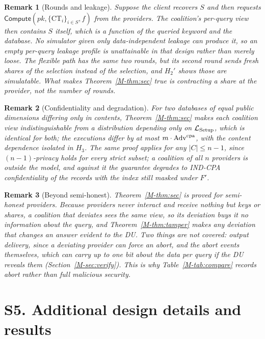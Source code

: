 \documentclass[11pt,a4paper]{article}
\newcommand{\mref}[1]{\ref{M-#1}}
\newtheorem{remark}{Remark}[section]
\newcommand{\Compute}{\mathsf{Compute}}
\begin{document}
\begin{remark}[Rounds and leakage]
\label{rem:v1}
Suppose the client recovers $S$ and then requests
$\Compute(pk,\{\text{CT}_i\}_{i\in S},f)$ from the providers. The coalition's
per-query view then contains $S$ itself, which is a function of the queried
keyword and the database. No simulator given only data-independent leakage can
produce it, so an empty per-query leakage profile is \emph{unattainable} in
that design rather than merely loose. The flexible path has the same two
rounds, but its second round sends fresh shares of the selection instead of
the selection, and $H_2'$ shows those are simulatable. What makes
Theorem~\mref{thm:sec} true is contracting a share at the provider, not the
number of rounds.
\end{remark}

\begin{remark}[Confidentiality and degradation]
For two databases of equal public dimensions differing only in contents,
Theorem~\mref{thm:sec} makes each coalition view indistinguishable from a
distribution depending only on $\mathcal{L}_{\mathrm{Setup}}$, which is identical
for both; the executions differ by at most $m\cdot\mathrm{Adv}^{\mathrm{cpa}}$,
with the content dependence isolated in $H_3$. The same proof applies for any
$|C|\le n-1$, since $(n{-}1)$-privacy holds for every strict subset; a
coalition of all $n$ providers is outside the model, and against it the
guarantee degrades to IND-CPA confidentiality of the records with the index
still masked under $F'$.
\end{remark}

\begin{remark}[Beyond semi-honest]
Theorem~\mref{thm:sec} is proved for semi-honest providers. Because providers
never interact and receive nothing but keys or shares, a coalition that
deviates sees the same view, so its deviation buys it no information about the
query, and Theorem~\mref{thm:tamper} makes any deviation that changes an answer
evident to the DU. Two things are not covered: output delivery, since a
deviating provider can force an abort, and the abort events themselves, which
can carry up to one bit about the data per query if the DU reveals them
(Section~\mref{sec:verify}). This is why Table~\mref{tab:compare} records
\emph{abort} rather than full malicious security.
\end{remark}

\section*{S5. Additional design details and results}
\end{document}
